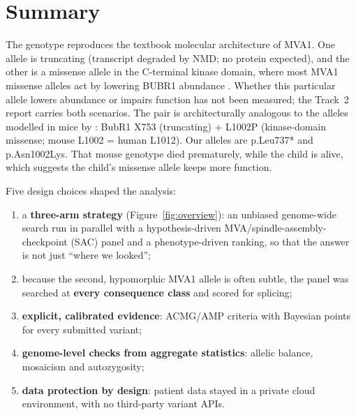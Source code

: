 \documentclass[10pt]{article}
\begin{document}
\section{Summary}

The genotype reproduces the textbook molecular architecture of MVA1. One allele is truncating (transcript degraded by
NMD; no protein expected), and the other is a missense allele in the C-terminal kinase domain, where most MVA1 missense alleles act by lowering BUBR1
abundance \citep{hanks,suij}. Whether this particular allele lowers abundance or impairs function has not been
measured; the Track~2 report carries both scenarios. The pair is
architecturally analogous to the alleles modelled in mice by \citet{sieben}: BubR1 X753 (truncating) + L1002P (kinase-domain
missense; mouse L1002 = human L1012). Our alleles are p.Leu737* and p.Asn1002Lys. That mouse genotype died
prematurely, while the child is alive, which suggests the child's missense allele keeps more function.

Five design choices shaped the analysis:
\begin{enumerate}[label=(\roman*)]
\item a \textbf{three-arm strategy} (Figure~\ref{fig:overview}): an unbiased genome-wide search run in parallel with a
  hypothesis-driven MVA/spindle-assembly-checkpoint (SAC) panel and a phenotype-driven ranking, so that the answer is not just ``where we looked'';
\item because the second, hypomorphic MVA1 allele is often subtle, the panel was searched at \textbf{every
  consequence class} and scored for splicing;
\item \textbf{explicit, calibrated evidence}: ACMG/AMP criteria with Bayesian points for every submitted variant;
\item \textbf{genome-level checks from aggregate statistics}: allelic balance, mosaicism and autozygosity;
\item \textbf{data protection by design}: patient data stayed in a private cloud environment, with no third-party
  variant APIs.
\end{enumerate}
\end{document}

